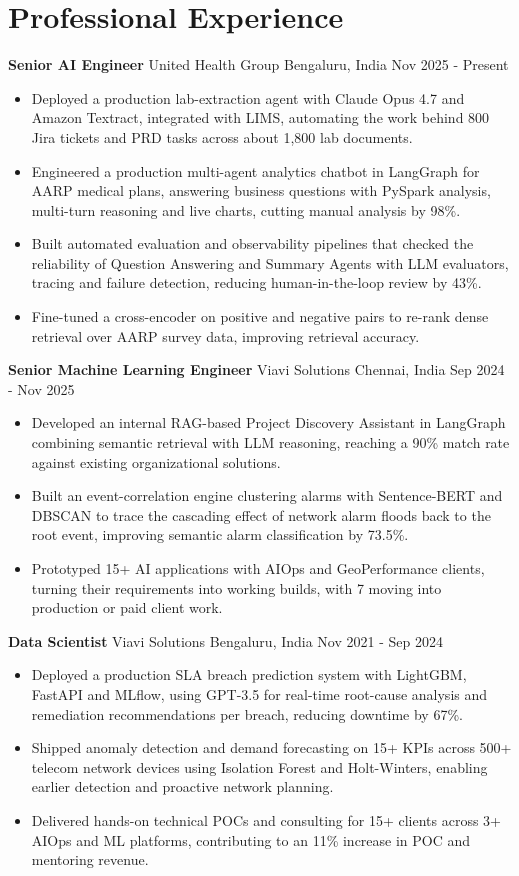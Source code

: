 \documentclass[10pt,a4paper]{article}
\newcommand{\role}[4]{\textbf{#1} \textbar{} #2 \hfill #3 \textbar{} #4\par}
\begin{document}
\section{Professional Experience}
\role{Senior AI Engineer}{United Health Group}{Bengaluru, India}{Nov 2025 - Present}
\begin{itemize}
  \item Deployed a production lab-extraction agent with Claude Opus 4.7 and Amazon Textract, integrated with LIMS, automating the work behind 800 Jira tickets and PRD tasks across about 1,800 lab documents.
  \item Engineered a production multi-agent analytics chatbot in LangGraph for AARP medical plans, answering business questions with PySpark analysis, multi-turn reasoning and live charts, cutting manual analysis by 98\%.
  \item Built automated evaluation and observability pipelines that checked the reliability of Question Answering and Summary Agents with LLM evaluators, tracing and failure detection, reducing human-in-the-loop review by 43\%.
  \item Fine-tuned a cross-encoder on positive and negative pairs to re-rank dense retrieval over AARP survey data, improving retrieval accuracy.
\end{itemize}
\vspace{3pt}
\role{Senior Machine Learning Engineer}{Viavi Solutions}{Chennai, India}{Sep 2024 - Nov 2025}
\begin{itemize}
  \item Developed an internal RAG-based Project Discovery Assistant in LangGraph combining semantic retrieval with LLM reasoning, reaching a 90\% match rate against existing organizational solutions.
  \item Built an event-correlation engine clustering alarms with Sentence-BERT and DBSCAN to trace the cascading effect of network alarm floods back to the root event, improving semantic alarm classification by 73.5\%.
  \item Prototyped 15+ AI applications with AIOps and GeoPerformance clients, turning their requirements into working builds, with 7 moving into production or paid client work.
\end{itemize}
\vspace{3pt}
\role{Data Scientist}{Viavi Solutions}{Bengaluru, India}{Nov 2021 - Sep 2024}
\begin{itemize}
  \item Deployed a production SLA breach prediction system with LightGBM, FastAPI and MLflow, using GPT-3.5 for real-time root-cause analysis and remediation recommendations per breach, reducing downtime by 67\%.
  \item Shipped anomaly detection and demand forecasting on 15+ KPIs across 500+ telecom network devices using Isolation Forest and Holt-Winters, enabling earlier detection and proactive network planning.
  \item Delivered hands-on technical POCs and consulting for 15+ clients across 3+ AIOps and ML platforms, contributing to an 11\% increase in POC and mentoring revenue.
\end{itemize}
\end{document}
